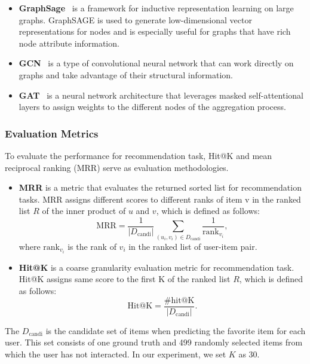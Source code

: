 \begin{itemize}
\item \textbf{GraphSage}~\cite{graphsage}
is a framework for inductive representation learning on large graphs. GraphSAGE is used to generate low-dimensional vector representations for nodes and is especially useful for graphs that have rich node attribute information.

\item \textbf{GCN}~\cite{gcn}
is a type of convolutional neural network that can work directly on graphs and take advantage of their structural information.


\item \textbf{GAT}~\cite{gat}
is a neural network architecture that leverages masked self-attentional layers to assign weights to the different nodes of the aggregation process.
\end{itemize}



\subsubsection{\textbf{Evaluation Metrics}}
To evaluate the performance for recommendation task, Hit@K \cite{hitk} and mean reciprocal ranking (MRR) \cite{mrr} serve as evaluation methodologies. 
\begin{itemize}
    \item \textbf{MRR} is a metric that evaluates the returned sorted list for recommendation tasks. MRR assigns different scores to different ranks of item v in the ranked list $R$ of the inner product of \(u\) and \(v\), which is defined as follows: 
    \begin{equation}\label{mrr}
        \text{MRR}=\frac{1}{|D_\text{candi}|} \sum_{(u_i,v_i)\in D_\text{candi}}\frac{1}{\text{rank}_{v_i}},
    \end{equation}
    where $\text{rank}_{v_i}$ is the rank of $v_i$ in the ranked list of user-item pair.
    \item \textbf{Hit@K} is a coarse granularity evaluation metric for recommendation task. Hit@K assigns same score to the first K of the ranked list $R$, which is defined as follows:
    \begin{equation}\label{hitk}
        \text{Hit@K}=\frac{\text{\#hit@K}}{|D_\text{candi}|}.
    \end{equation}
\end{itemize}
The $D_\text{candi}$ is the candidate set of items when predicting the favorite item for each user.
This set consists of one ground truth and 499 randomly selected items from which the user has not interacted.
In our experiment, we set $K$ as 30.





